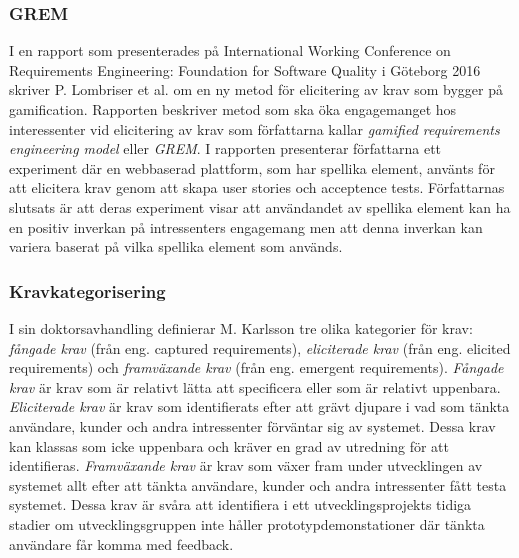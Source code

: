 \subsubsection{GREM}
I en rapport som presenterades på International Working Conference on Requirements Engineering: Foundation for Software Quality i Göteborg 2016 skriver P. Lombriser et al. \cite{lombriser2016gamified} om en ny metod för elicitering av krav som bygger på gamification. Rapporten beskriver metod som ska öka engagemanget hos interessenter vid elicitering av krav som författarna kallar \textit{gamified requirements engineering model} eller \textit{GREM}. I rapporten presenterar författarna ett experiment där en webbaserad plattform, som har spellika element, använts för att elicitera krav genom att skapa user stories och acceptence tests. Författarnas slutsats är att deras experiment visar att användandet av spellika element kan ha en positiv inverkan på intressenters engagemang men att denna inverkan kan variera baserat på vilka spellika element som används.

\subsubsection{Kravkategorisering}
I sin doktorsavhandling definierar M. Karlsson tre olika kategorier för krav: \textit{fångade krav} (från eng. captured requirements), \textit{eliciterade krav} (från eng. elicited requirements) och \textit{framväxande krav} (från eng. emergent requirements)\cite{lkp.26083619960101}. \textit{Fångade krav} är krav som är relativt lätta att specificera eller som är relativt uppenbara. \textit{Eliciterade krav} är krav som identifierats efter att grävt djupare i vad som tänkta användare, kunder och andra intressenter förväntar sig av systemet. Dessa krav kan klassas som icke uppenbara och kräver en grad av utredning för att identifieras. \textit{Framväxande krav} är krav som växer fram under utvecklingen av systemet allt efter att tänkta användare, kunder och andra intressenter fått testa systemet. Dessa krav är svåra att identifiera i ett utvecklingsprojekts tidiga stadier om utvecklingsgruppen inte håller prototypdemonstationer där tänkta användare får komma med feedback. 
 
